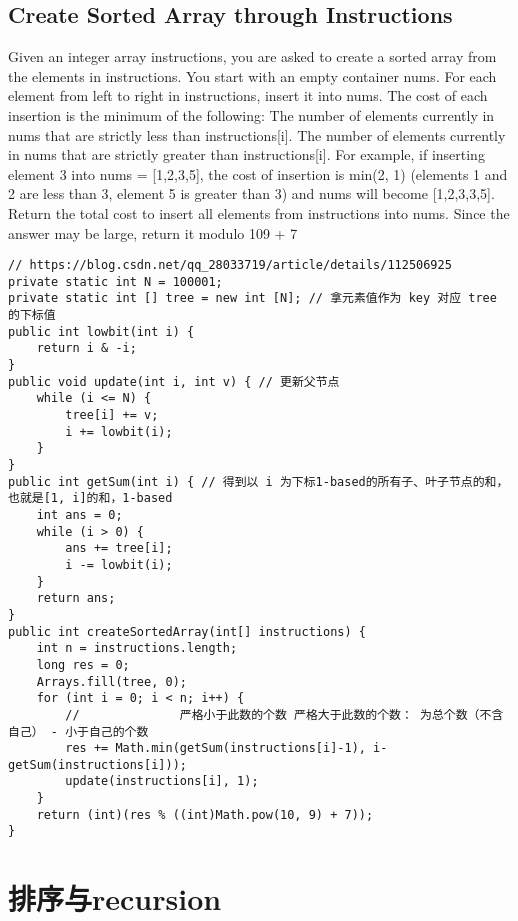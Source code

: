 \documentclass[9pt, b5paaper]{book}
\begin{document}
\section{Create Sorted Array through Instructions}
\label{sec-2-1}
Given an integer array instructions, you are asked to create a sorted array from the elements in instructions. You start with an empty container nums. For each element from left to right in instructions, insert it into nums. The cost of each insertion is the minimum of the following:
The number of elements currently in nums that are strictly less than instructions[i].
The number of elements currently in nums that are strictly greater than instructions[i].
For example, if inserting element 3 into nums = [1,2,3,5], the cost of insertion is min(2, 1) (elements 1 and 2 are less than 3, element 5 is greater than 3) and nums will become [1,2,3,3,5].
Return the total cost to insert all elements from instructions into nums. Since the answer may be large, return it modulo 109 + 7
\begin{verbatim}
// https://blog.csdn.net/qq_28033719/article/details/112506925
private static int N = 100001;
private static int [] tree = new int [N]; // 拿元素值作为 key 对应 tree 的下标值
public int lowbit(int i) {
    return i & -i;
}
public void update(int i, int v) { // 更新父节点
    while (i <= N) {
        tree[i] += v;
        i += lowbit(i);
    }
}
public int getSum(int i) { // 得到以 i 为下标1-based的所有子、叶子节点的和， 也就是[1, i]的和，1-based
    int ans = 0;
    while (i > 0) {
        ans += tree[i];
        i -= lowbit(i);
    }
    return ans;
}
public int createSortedArray(int[] instructions) {
    int n = instructions.length;
    long res = 0;
    Arrays.fill(tree, 0);
    for (int i = 0; i < n; i++) {
        //              严格小于此数的个数 严格大于此数的个数： 为总个数（不含自己） - 小于自己的个数
        res += Math.min(getSum(instructions[i]-1), i-getSum(instructions[i])); 
        update(instructions[i], 1);
    }
    return (int)(res % ((int)Math.pow(10, 9) + 7));
}
\end{verbatim}

\chapter{排序与recursion}
\label{sec-3}
\end{document}
